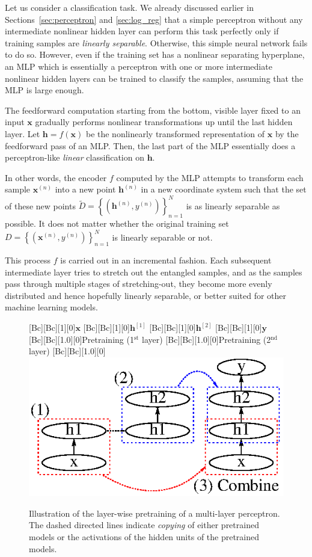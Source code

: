 \documentclass[dissertation,nocontribution,draft*]{aaltoseries}
\newcommand{\qlay}[1]{\left[#1\right]}
\newcommand{\vect}[1]{\mathbf{#1}}
\newcommand{\vh}[0]{\vect{h}}
\newcommand{\vx}[0]{\vect{x}}
\newcommand{\vy}[0]{\vect{y}}
\begin{document}
Let us consider a classification task. We already
discussed earlier in Sections~\ref{sec:perceptron} and
\ref{sec:log_reg} that a simple perceptron without any
intermediate nonlinear hidden layer can perform this task
perfectly only if training samples are \textit{linearly
separable}. Otherwise, this simple neural network fails to
do so.  However, even
if the training set has a nonlinear separating hyperplane,
an MLP which is essentially a perceptron with one or more
intermediate nonlinear hidden layers can be trained to
classify the samples, assuming that the MLP is large enough.

The feedforward computation starting from the bottom,
visible layer fixed to an input $\vx$ gradually performs
nonlinear transformations up until the last hidden layer.
Let $\vh=f(\vx)$ be the nonlinearly transformed
representation of $\vx$ by the feedforward pass of an MLP.
Then, the last part of the MLP essentially does a
perceptron-like \textit{linear} classification on $\vh$.

In other words, the encoder $f$ computed by the MLP attempts to
transform each sample $\vx^{(n)}$ into a new point
$\vh^{(n)}$ in a new coordinate system such that the set of
these new points $\tilde{D} = \left\{ (\vh^{(n)}, y^{(n)})
\right\}_{n=1}^N$ is as linearly separable as possible. It
does not matter whether the original training set $D=\left\{
(\vx^{(n)},y^{(n)}) \right\}_{n=1}^N$ is linearly
separable or not.

This process $f$ is carried out in an incremental fashion. Each
subsequent intermediate layer tries to stretch out the
entangled samples, and as the samples pass through multiple
stages of stretching-out, they become more evenly
distributed and hence hopefully linearly separable, or
better suited for other machine learning models. 

\begin{figure}[t]
    \centering
    [Bc][Bc][1][0]{$\vx$}
    [Bc][Bc][1][0]{$\vh^{\qlay{1}}$}
    [Bc][Bc][1][0]{$\vh^{\qlay{2}}$}
    [Bc][Bc][1][0]{$\vy$}
    [Bc][Bc][1.0][0]{Pretraining
    (1$^\text{st}$ layer)}
    [Bc][Bc][1.0][0]{Pretraining
    (2$^\text{nd}$ layer)}
    [Bc][Bc][1.0][0]{}
    \includegraphics[width=0.7\columnwidth]{figures/pretrain_mlp.eps}
    \caption{Illustration of the layer-wise pretraining of
    a multi-layer perceptron. The dashed directed lines
    indicate \textit{copying} of either pretrained models or
    the activations of the hidden units of the pretrained
    models.}
    \label{fig:incr_feat}
\end{figure}
\end{document}

